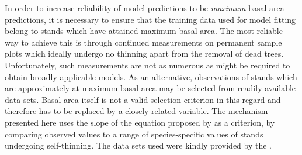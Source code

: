 In order to increase reliability of model predictions to be \emph{maximum} basal area predictions, it is necessary to ensure that the training data used for model fitting belong to stands which have attained maximum basal area.  The most reliable way to achieve this is through continued measurements on permanent sample plots which ideally undergo no thinning apart from the removal of dead trees.  Unfortunately, such measurements are not as numerous as might be required to obtain broadly applicable models.  As an alternative, observations of stands which are approximately at maximum basal area may be selected from readily available data sets.  Basal area itself is not a valid selection criterion in this regard and therefore has to be replaced by a closely related variable.  The mechanism presented here uses the slope of the equation proposed by \textcite{Reineke1933} as a criterion, by comparing observed values to a range of species-specific values of stands undergoing self-thinning.  The data sets used were kindly provided by the \NWFVA{}.


